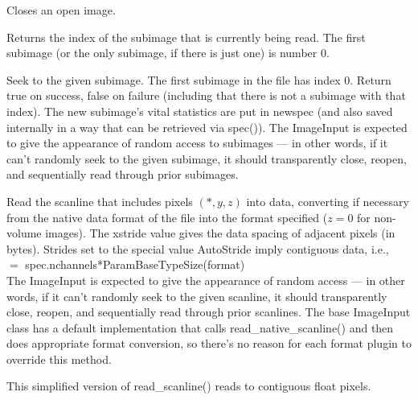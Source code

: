 Closes an open image.
\apiend


Returns the index of the subimage that is currently being read.
The first subimage (or the only subimage, if there is just one) is
number 0.
\apiend


Seek to the given subimage.  The first subimage in the file has index 0.
Return {\kw true} on success, {\kw false} on failure (including that
there is not a subimage with that index).  The new subimage's vital
statistics are put in {\kw newspec} (and also saved internally in a way
that can be retrieved via {\kw spec()}).  The {\kw ImageInput} is
expected to give the appearance of random access to subimages --- in
other words, if it can't randomly seek to the given subimage, it should
transparently close, reopen, and sequentially read through prior
subimages.
\apiend


Read the scanline that includes pixels $(*,y,z)$ into {\kw data},
converting if necessary from the native data format of the file into the
{\kw format} specified ($z=0$ for non-volume images).  The {\kw xstride}
value gives the data spacing of adjacent pixels (in bytes).  Strides set
to the special value {\kw AutoStride} imply contiguous data, i.e., \\
   $=$ {\kw spec.nchannels*ParamBaseTypeSize(format)} \\
The {\kw ImageInput} is expected to give the appearance of random access
--- in other words, if it can't randomly seek to the given scanline, it
should transparently close, reopen, and sequentially read through prior
scanlines.  The base {\kw ImageInput} class has a default implementation
that calls {\kw read_native_scanline()} and then does appropriate format
conversion, so there's no reason for each format plugin to override this
method.
\apiend

This simplified version of {\kw read_scanline()} reads to contiguous 
float pixels.
\apiend

